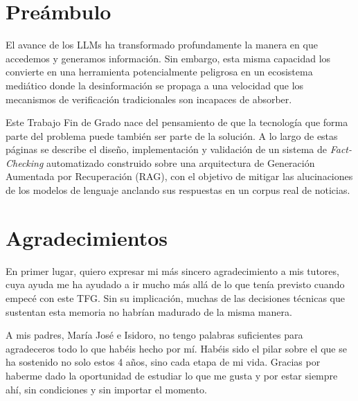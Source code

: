 

\chapter*{Preámbulo}
\thispagestyle{empty}

El avance de los LLMs ha transformado profundamente la manera en que accedemos y generamos información. Sin embargo, esta misma capacidad los convierte en una herramienta potencialmente peligrosa en un ecosistema mediático donde la desinformación se propaga a una velocidad que los mecanismos de verificación tradicionales son incapaces de absorber.

Este Trabajo Fin de Grado nace del pensamiento de que la tecnología que forma parte del problema puede también ser parte de la solución. A lo largo de estas páginas se describe el diseño, implementación y validación de un sistema de \textit{Fact-Checking} automatizado construido sobre una arquitectura de Generación Aumentada por Recuperación (RAG), con el objetivo de mitigar las alucinaciones de los modelos de lenguaje anclando sus respuestas en un corpus real de noticias.

\cleardoublepage %

\chapter*{Agradecimientos}

\thispagestyle{empty}
\vspace{1cm}

En primer lugar, quiero expresar mi más sincero agradecimiento a mis tutores, cuya ayuda me ha ayudado a ir mucho más allá de lo que tenía previsto cuando empecé con este TFG. Sin su implicación, muchas de las decisiones técnicas que sustentan esta memoria no habrían madurado de la misma manera.

A mis padres, María José e Isidoro, no tengo palabras suficientes para agradeceros todo lo que habéis hecho por mí. Habéis sido el pilar sobre el que se ha sostenido no solo estos 4 años, sino cada etapa de mi vida. Gracias por haberme dado la oportunidad de estudiar lo que me gusta y por estar siempre ahí, sin condiciones y sin importar el momento.

